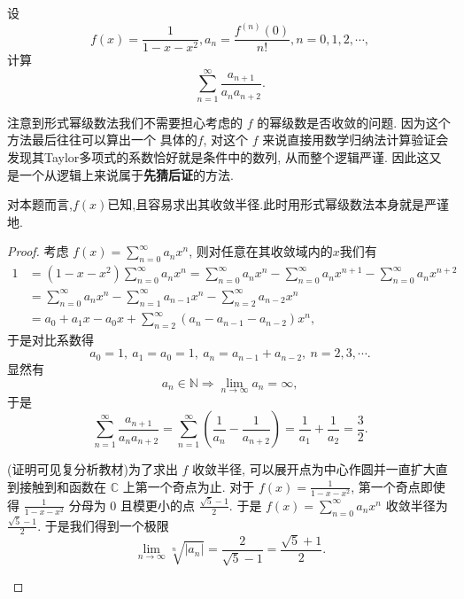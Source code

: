 \documentclass[../../main.tex]{subfiles}%
\begin{document}
\begin{example}
设
\[
f(x)=\frac{1}{1 - x - x^2}, a_n=\frac{f^{(n)}(0)}{n!}, n = 0,1,2,\cdots,
\]
计算
\[
\sum_{n = 1}^{\infty}\frac{a_{n + 1}}{a_n a_{n + 2}}.
\]
\end{example}
\begin{note}

注意到形式幂级数法我们不需要担心考虑的 \( f \) 的幂级数是否收敛的问题. 因为这个方法最后往往可以算出一个 具体的\( f \), 对这个 \( f \) 来说直接用数学归纳法计算验证会发现其Taylor多项式的系数恰好就是条件中的数列, 从而整个逻辑严谨. 因此这又是一个从逻辑上来说属于\textbf{先猜后证}的方法.

对本题而言,$f(x)$已知,且容易求出其收敛半径.此时用形式幂级数法本身就是严谨地.
\end{note}
\begin{proof}
考虑 \( f(x)=\sum_{n = 0}^{\infty}a_n x^n \), 则对任意在其收敛域内的$x$我们有
\begin{align}
1&=(1 - x - x^2)\sum_{n = 0}^{\infty}a_n x^n=\sum_{n = 0}^{\infty}a_n x^n-\sum_{n = 0}^{\infty}a_n x^{n + 1}-\sum_{n = 0}^{\infty}a_n x^{n + 2}\nonumber \\
&=\sum_{n = 0}^{\infty}a_n x^n-\sum_{n = 1}^{\infty}a_{n - 1}x^n-\sum_{n = 2}^{\infty}a_{n - 2}x^n\nonumber \\
&=a_0 + a_1 x - a_0 x + \sum_{n = 2}^{\infty}(a_n - a_{n - 1} - a_{n - 2})x^n,\nonumber
\end{align}
于是对比系数得
\[
a_0 = 1,\ a_1 = a_0 = 1,\ a_n = a_{n - 1} + a_{n - 2},\ n = 2,3,\cdots. 
\]
显然有
\[
a_n\in\mathbb{N}\Rightarrow\lim_{n\rightarrow\infty}a_n=\infty,
\]
于是
\[
\sum_{n = 1}^{\infty}\frac{a_{n + 1}}{a_n a_{n + 2}}=\sum_{n = 1}^{\infty}\left(\frac{1}{a_n}-\frac{1}{a_{n + 2}}\right)=\frac{1}{a_1}+\frac{1}{a_2}=\frac{3}{2}.
\]
\begin{remark}
(证明可见复分析教材)为了求出 \( f \) 收敛半径, 可以展开点为中心作圆并一直扩大直到接触到和函数在 \( \mathbb{C} \) 上第一个奇点为止. 对于 \( f(x)=\frac{1}{1 - x - x^2} \), 第一个奇点即使得 \( \frac{1}{1 - x - x^2} \) 分母为 0 且模更小的点 \( \frac{\sqrt{5}-1}{2} \). 于是 \( f(x)=\sum_{n = 0}^{\infty}a_n x^n \) 收敛半径为 \( \frac{\sqrt{5}-1}{2} \). 于是我们得到一个极限
\[
\lim_{n\rightarrow\infty}\sqrt[n]{|a_n|}=\frac{2}{\sqrt{5}-1}=\frac{\sqrt{5}+1}{2}.
\]
\end{remark}
\end{proof}
\end{document}
